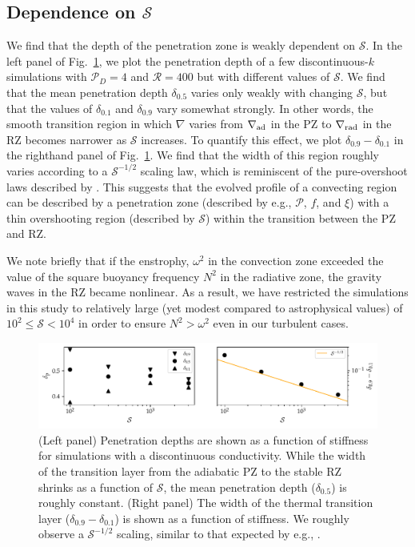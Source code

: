 \documentclass[twocolumn]{aastex631}
\newcommand{\gradrad}{\ensuremath{\nabla_{\rm{rad}}}}
\newcommand{\gradad}{\ensuremath{\nabla_{\rm{ad}}}}
\newcommand{\justgrad}{\ensuremath{\nabla}}
\newcommand{\mP}{\ensuremath{\mathcal{P}}}
\newcommand{\mR}{\ensuremath{\mathcal{R}}}
\newcommand{\mS}{\ensuremath{\mathcal{S}}}
\begin{document}
\subsection{Dependence on $\mS$}

We find that the depth of the penetration zone is weakly dependent on $\mS$.
In the left panel of Fig.~\ref{fig:parameters_vs_s}, we plot the penetration depth of a few discontinuous-$k$ simulations with $\mP_D = 4$ and $\mR = 400$ but with different values of $\mS$.
We find that the mean penetration depth $\delta_{0.5}$ varies only weakly with changing $\mS$, but that the values of $\delta_{0.1}$ and $\delta_{0.9}$ vary somewhat strongly.
In other words, the smooth transition region in which $\justgrad$ varies from $\gradad$ in the PZ to $\gradrad$ in the RZ becomes narrower as $\mS$ increases.
To quantify this effect, we plot $\delta_{0.9} - \delta_{0.1}$ in the righthand panel of Fig.~\ref{fig:parameters_vs_s}.
We find that the width of this region roughly varies according to a $\mS^{-1/2}$ scaling law, which is reminiscent of the pure-overshoot laws described by \citet{korre_etal_2019}.
This suggests that the evolved profile of a convecting region can be described by a penetration zone (described by e.g., $\mP$, $f$, and $\xi$) with a thin overshooting region (described by $\mS$) within the transition between the PZ and RZ.

We note briefly that if the enstrophy, $\omega^2$ in the convection zone exceeded the value of the square buoyancy frequency $N^2$ in the radiative zone, the gravity waves in the RZ became nonlinear.
As a result, we have restricted the simulations in this study to relatively large (yet modest compared to astrophysical values) of $10^{2} \leq \mS < 10^4$ in order to ensure $N^2 > \omega^2$ even in our turbulent cases.

\begin{figure}[t!]
\centering
\includegraphics{parameters_vs_s.pdf}
\caption{
(Left panel) Penetration depths are shown as a function of stiffness for simulations with a discontinuous conductivity.
While the width of the transition layer from the adiabatic PZ to the stable RZ shrinks as a function of $\mS$, the mean penetration depth ($\delta_{0.5}$) is roughly constant.
(Right panel) The width of the thermal transition layer ($\delta_{0.9} - \delta_{0.1}$) is shown as a function of stiffness.
We roughly observe a $\mS^{-1/2}$ scaling, similar to that expected by e.g., \citet{korre_etal_2019}.
\label{fig:parameters_vs_s}
}
\end{figure}
\end{document}
